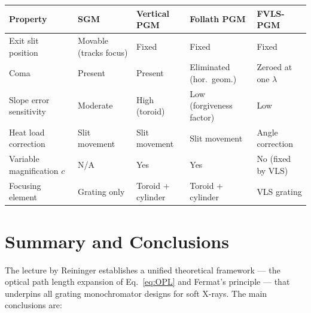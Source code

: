 \documentclass[12pt,a4paper]{article}
\begin{document}
\begin{center}
\renewcommand{\arraystretch}{1.7}
\begin{tabular}{p{3.2cm} p{2.5cm} p{2.5cm} p{2.5cm} p{2.5cm}}
\toprule
\textbf{Property}
  & \textbf{SGM}
  & \textbf{Vertical PGM}
  & \textbf{Follath PGM}
  & \textbf{FVLS-PGM} \\
\midrule
Exit slit position
  & Movable (tracks focus)
  & Fixed
  & Fixed
  & Fixed \\
Coma
  & Present
  & Present
  & Eliminated (hor.\ geom.)
  & Zeroed at one $\lambda$ \\
Slope error sensitivity
  & Moderate
  & High (toroid)
  & Low (forgiveness factor)
  & Low \\
Heat load correction
  & Slit movement
  & Slit movement
  & Slit movement
  & Angle correction \\
Variable magnification $c$
  & N/A
  & Yes
  & Yes
  & No (fixed by VLS) \\
Focusing element
  & Grating only
  & Toroid + cylinder
  & Toroid + cylinder
  & VLS grating \\
\bottomrule
\end{tabular}
\end{center}

\section{Summary and Conclusions}

The lecture by Reininger establishes a unified theoretical framework --- the optical path
length expansion of Eq.~\eqref{eq:OPL} and Fermat's principle --- that underpins all
grating monochromator designs for soft X-rays.  The main conclusions are:
\end{document}
